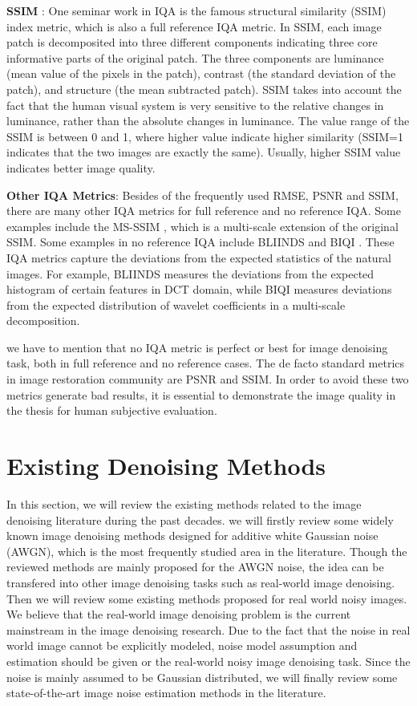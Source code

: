 \textbf{SSIM} \cite{ssim}: One seminar work in IQA is the famous structural similarity (SSIM) index metric, which is also a full reference IQA metric. In SSIM, each image patch is decomposited into three different components indicating three core informative parts of the original patch. The three components are luminance (mean value of the pixels in the patch), contrast (the standard deviation of the patch), and structure (the mean subtracted patch). SSIM takes into account the fact that the human visual system is very sensitive to the relative changes in luminance, rather than the absolute changes in luminance. The value range of the SSIM is between 0 and 1, where higher value indicate higher similarity (SSIM=1 indicates that the two images are exactly the same). Usually, higher SSIM value indicates better image quality. 

\textbf{Other IQA Metrics}: Besides of the frequently used RMSE, PSNR and SSIM, there are many other IQA metrics for full reference and no reference IQA. Some examples include the MS-SSIM \cite{msssim}, which is a multi-scale extension of the original SSIM. Some examples in no reference IQA include BLIINDS \cite{bliinds} and BIQI \cite{biqi}. These IQA metrics capture the deviations from the expected statistics of the natural images. For example, BLIINDS measures the deviations from the expected histogram of certain features in DCT domain, while BIQI measures deviations from the expected distribution of wavelet coefficients in a multi-scale decomposition.

we have to mention that no IQA metric is perfect or best for image denoising task, both in full reference and no reference cases. The de facto standard metrics in image restoration community are PSNR and SSIM. In order to avoid these two metrics generate bad results, it is essential to demonstrate the image quality in the thesis for human subjective evaluation.


\section{Existing Denoising Methods}

In this section, we will review the existing methods related to the image denoising literature during the past decades. we will firstly review some widely known image denoising methods designed for additive white Gaussian noise (AWGN), which is the most frequently studied area in the literature. Though the reviewed methods are mainly proposed for the AWGN noise, the idea can be transfered into other image denoising tasks such as real-world image denoising. Then we will review some existing methods proposed for real world noisy images. We believe that the real-world image denoising problem is the current mainstream in the image denoising research. Due to the fact that the noise in real world image cannot be explicitly modeled, noise model assumption and estimation should be given or the real-world noisy image denoising task. Since the noise is mainly assumed to be Gaussian distributed, we will finally review some state-of-the-art image noise estimation methods in the literature.


